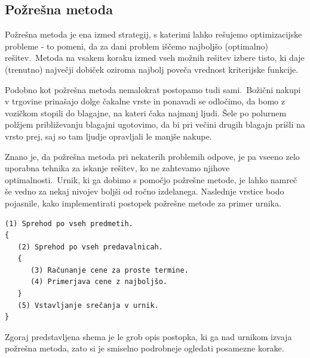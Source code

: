 \documentclass[a4paper]{article}
\begin{document}
\subsection{Požrešna metoda} %

Požrešna metoda je ena izmed strategij, s katerimi lahko rešujemo optimizacijske probleme -
to pomeni, da za dani problem iščemo najboljšo (optimalno) rešitev.\ Metoda na vsakem koraku
izmed vseh možnih rešitev izbere  tisto, ki daje (trenutno) največji dobiček oziroma najbolj
poveča vrednost kriterijske funkcije.

Podobno kot požrešna metoda nemalokrat postopamo tudi sami.\ Božični nakupi v trgovine
prinašajo dolge čakalne vrste in ponavadi se odločimo, da bomo z vozičkom stopili do blagajne,
na kateri čaka najmanj ljudi. Šele po polurnem polžjem približevanju blagajni ugotovimo,
da bi pri večini drugih blagajn prišli na vrsto prej, saj so tam ljudje opravljali le
manjše nakupe.

Znano je, da požrešna metoda pri nekaterih problemih odpove, je pa vseeno zelo uporabna
tehnika za iskanje rešitev, ko ne zahtevamo njihove optimalnosti.\ Urnik, ki ga dobimo s
pomočjo požrešne metode, je lahko namreč še vedno za nekaj nivojev boljši od ročno izdelanega.
Naslednje vrstice bodo pojasnile, kako implementirati postopek požrešne metode za primer urnika.

\begin{verbatim}
(1) Sprehod po vseh predmetih.
{
   (2) Sprehod po vseh predavalnicah.
   {
      (3) Računanje cene za proste termine.
      (4) Primerjava cene z najboljšo.
   }
   (5) Vstavljanje srečanja v urnik.
}
\end{verbatim}

\noindent Zgoraj predstavljena shema je le grob opis postopka, ki ga nad urnikom izvaja požrešna metoda,
zato si je smiselno podrobneje ogledati posamezne korake.
\end{document}
